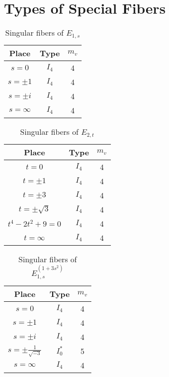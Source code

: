 \documentclass[main]{subfiles}
\begin{document}
\chapter{Types of Special Fibers}
\begin{table}[h]
    \centering
    \caption{Singular fibers of $E_{1,s}$}
    \begin{tabular}{|c|c|c|}
        \hline
        Place      & Type  & $m_v$ \\
        \hline
        $s=0$      & $I_4$ & 4     \\
        $s=\pm 1$  & $I_4$ & 4     \\
        $s=\pm i$  & $I_4$ & 4     \\
        $s=\infty$ & $I_4$ & 4     \\
        \hline
    \end{tabular}
\end{table}

\begin{table}[h]
    \centering
    \caption{Singular fibers of $E_{2,t}$}
    \begin{tabular}{|c|c|c|}
        \hline
        Place            & Type  & $m_v$ \\
        \hline
        $t=0$            & $I_4$ & 4     \\
        $t=\pm 1$        & $I_4$ & 4     \\
        $t=\pm 3$        & $I_4$ & 4     \\
        $t=\pm \sqrt{3}$ & $I_4$ & 4     \\
        $t^4-2t^2+9=0$   & $I_4$ & 4     \\
        $t=\infty$       & $I_4$ & 4     \\
        \hline
    \end{tabular}
\end{table}

\begin{table}[h]
    \centering
    \caption{Singular fibers of $E_{1,s}^{(1 + 3s^{2})}$}
    \begin{tabular}{|c|c|c|}
        \hline
        Place                        & Type    & $m_v$ \\
        \hline
        $s=0$                        & $I_4$   & 4     \\
        $s=\pm 1$                    & $I_4$   & 4     \\
        $s=\pm i$                    & $I_4$   & 4     \\
        $s=\pm \frac{1}{\sqrt{-3}} $ & $I_0^*$ & 5     \\
        $s=\infty$                   & $I_4$   & 4     \\
        \hline
    \end{tabular}
\end{table}
\end{document}
